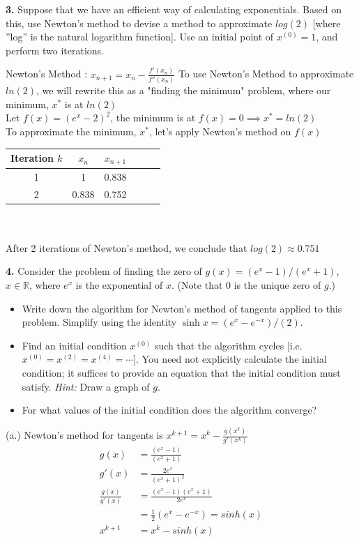 \documentclass[12pt]{article}
\begin{document}
\begin{mybluebox}
\textbf{3.} Suppose that we have an efficient way of calculating exponentials. Based on this, use Newton’s
method to devise a method to approximate $log(2)$ [where ”log” is the natural logarithm function].
Use an initial point of $x^{(0)} = 1$, and perform two iterations.
\end{mybluebox}
Newton's Method : $x_{n+1} = x_n - \frac{f'(x_{n})}{f''(x_{n})}$
To use Newton's Method to approximate $ln(2)$, we will rewrite this as a "finding the minimum" problem, where our minimum, $x^*$ is at $ln(2)$ \\
Let $f(x) = (e^{x} - 2)^2$, the minimum is at $f(x) = 0 \implies x^*=ln(2)$ \\
To approximate the minimum, $x^*$, let's apply Newton's method on $f(x)$ \bigbreak
\begin{tabular}{|c|c|c|c|c|c|}
    \hline
    Iteration $k$ & $x_n$ & $x_{n+1}$  \\
    \hline
    1 & 1 & 0.838 \\
    2 & 0.838 & 0.752\\
    \hline
\end{tabular}\\ \\
After 2 iterations of Newton's method, we conclude that $log(2) \approx 0.751$
\bigbreak
\begin{mybluebox}
    \textbf{4.} Consider the problem of finding the zero of $g(x) = (e^x - 1)/(e^x + 1)$, $x \in \mathbb{R}$, where $e^x$ is the exponential of $x$. (Note that $0$ is the unique zero of $g$.)
    \begin{itemize}
        \item[(a)] Write down the algorithm for Newton’s method of tangents applied to this problem. Simplify using the identity $\sinh{x} = (e^x - e^{-x})/(2)$.
        
        \item[(b)]Find an initial condition $x^{(0)}$ such that the algorithm cycles [i.e. $x^{(0)} = x^{(2)} = x^{(4)} = \cdots$]. You need not explicitly calculate the initial condition; it suffices to provide an equation that the initial condition must satisfy. \textit{Hint:} Draw a graph of $g$.
        
        \item[(c)] For what values of the initial condition does the algorithm converge?
    \end{itemize}
\end{mybluebox}
(a.) Newton's method for tangents is $x^{k+1} = x^k - \frac{g(x^k)}{g'(x^k)}$
\begin{align}
    g(x) &= \frac{(e^x - 1)}{(e^x + 1)} \\
    g'(x) &= \frac{2e^x}{(e^x+1)^2}\\
    \frac{g(x)}{g'(x)} &= \frac{(e^x-1)(e^x+1)}{2e^x} \\
     &= \frac{1}{2}(e^x-e^{-x}) = sinh(x)\\
    x^{k+1} &= x^k -  sinh(x)
\end{align}
\end{document}
